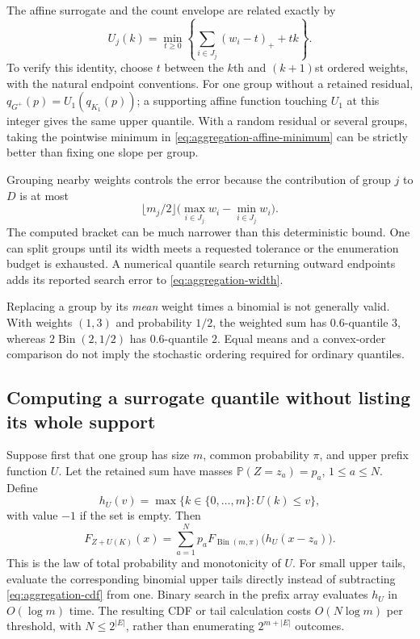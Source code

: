 \documentclass[11pt,letterpaper]{article}
\numberwithin{equation}{section}
\theoremstyle{definition}
\theoremstyle{remark}
\newcommand{\Pbb}{\mathbb P}
\begin{document}
The affine surrogate and the count envelope are related exactly by
\begin{equation}
 U_j(k)=\min_{t\ge0}\left\{\sum_{i\in J_j}(w_i-t)_++tk\right\}.
 \label{eq:aggregation-affine-minimum}
\end{equation}
To verify this identity, choose $t$ between the $k$th and $(k+1)$st ordered
weights, with the natural endpoint conventions. For one group without a
retained residual,
$q_{G^+}(p)=U_1(q_{K_1}(p))$; a supporting affine function touching $U_1$
at this integer gives the same upper quantile. With a random residual or
several groups, taking the pointwise minimum in
\eqref{eq:aggregation-affine-minimum} can be strictly better than fixing
one slope per group.

Grouping nearby weights controls the error because the contribution of
group $j$ to $D$ is at most
\[
 \lfloor m_j/2\rfloor
 \bigl(\max_{i\in J_j}w_i-\min_{i\in J_j}w_i\bigr).
\]
The computed bracket can be much narrower than this deterministic bound.
One can split groups until its width meets a requested tolerance or the
enumeration budget is exhausted. A numerical quantile search returning
outward endpoints adds its reported search error to
\eqref{eq:aggregation-width}.

Replacing a group by its \emph{mean} weight times a binomial is not generally
valid. With weights $(1,3)$ and probability $1/2$, the weighted sum has
$0.6$-quantile $3$, whereas $2\operatorname{Bin}(2,1/2)$ has
$0.6$-quantile $2$. Equal means and a convex-order comparison do not imply
the stochastic ordering required for ordinary quantiles.

\subsection{Computing a surrogate quantile without listing its whole support}

Suppose first that one group has size $m$, common probability $\pi$, and
upper prefix function $U$. Let the retained sum have masses
$\Pbb(Z=z_a)=p_a$, $1\le a\le N$. Define
\[
 h_U(v)=\max\{k\in\{0,\ldots,m\}:U(k)\le v\},
\]
with value $-1$ if the set is empty. Then
\begin{equation}
 F_{Z+U(K)}(x)=\sum_{a=1}^N p_a F_{\operatorname{Bin}(m,\pi)}
                      \bigl(h_U(x-z_a)\bigr).
 \label{eq:aggregation-cdf}
\end{equation}
This is the law of total probability and monotonicity of $U$.
For small upper tails, evaluate the corresponding binomial upper tails
directly instead of subtracting \eqref{eq:aggregation-cdf} from one.
Binary search in the prefix array evaluates $h_U$ in $O(\log m)$ time.
The resulting CDF or tail calculation costs $O(N\log m)$ per threshold,
with $N\le2^{|E|}$, rather than enumerating $2^{m+|E|}$ outcomes.
\end{document}

